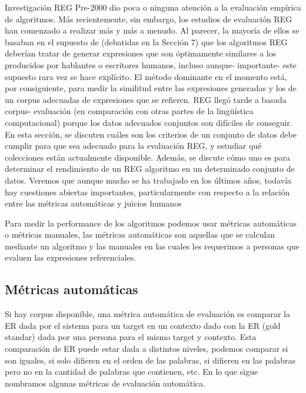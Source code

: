 Investigaci\'on REG Pre-2000 dio poca o ninguna atenci\'on a la evaluaci\'on emp\'irica de algoritmos. M\'as recientemente, sin embargo, los estudios de evaluaci\'on REG han comenzado a realizar
m\'as y m\'as a menudo. Al parecer, la mayor\'ia de ellos se basaban en el supuesto de
(debatidas en la Secci\'on 7) que los algoritmos REG deber\'ian tratar de generar expresiones que son
\'optimamente similares a los producidos por hablantes o escritores humanos, incluso aunque-
importante- este supuesto rara vez se hace expl\'icito. El m\'etodo dominante en
el momento est\'a, por consiguiente, para medir la similitud entre las expresiones generadas
y los de un corpus adecuadas de expresiones que se refieren. REG lleg\'o tarde a basada corpus-
evaluaci\'on (en comparaci\'on con otras partes de la lingü\'istica computacional) porque los datos adecuados
conjuntos son dif\'iciles de conseguir. En esta secci\'on, se discuten cu\'ales son los criterios de un conjunto de datos debe cumplir
para que sea adecuado para la evaluaci\'on REG, y estudiar qu\'e colecciones est\'an actualmente
disponible. Adem\'as, se discute c\'omo uno es para determinar el rendimiento de un REG
algoritmo en un determinado conjunto de datos. Veremos que aunque mucho se ha trabajado en
los \'ultimos a\~nos, todav\'ia hay cuestiones abiertas importantes, particularmente con respecto a la relaci\'on
entre las m\'etricas autom\'aticas y juicios humanos

Para medir la performance de los algoritmos podemos usar m\'etricas autom\'aticas o m\'etricas manuales, las m\'etricas autom\'aticas son aquellas que se calculan mediante un algoritmo y las manuales en las cuales les requerimos a personas que evaluen las expresiones referenciales.


\subsection{M\'etricas autom\'aticas}


Si hay corpus disponible, una m\'etrica autom\'atica de evaluaci\'on es comparar la ER dada por el sistema para un target en un contexto dado con la ER (gold standar) dada por una persona para el mismo target y contexto.
Esta comparaci\'on de ER puede estar dada a distintos niveles, podemos comparar si son iguales, si solo difieren en el orden de las palabras, si difieren en las palabras pero no en la cantidad de palabras que contienen, etc. En lo que sigue nombramos algunas m\'etricas de evaluaci\'on autom\'atica.\\

